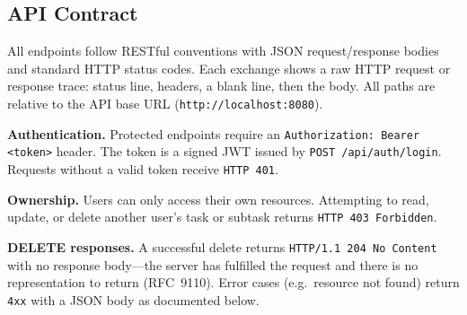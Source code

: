 \subsection{API Contract}\label{sec:api}
All endpoints follow RESTful conventions with JSON request/response bodies and standard HTTP status codes.
Each exchange shows a raw HTTP request or response trace: status line, headers, a blank line, then the body.
All paths are relative to the API base URL (\texttt{http://localhost:8080}).


\noindent\textbf{Authentication.} Protected endpoints require an \texttt{Authorization: Bearer <token>}
header. The token is a signed JWT issued by \texttt{POST /api/auth/login}. Requests without a valid
token receive \texttt{HTTP 401}.


\noindent\textbf{Ownership.} Users can only access their own resources. Attempting to read, update,
or delete another user's task or subtask returns \texttt{HTTP 403 Forbidden}.


\noindent\textbf{DELETE responses.} A successful delete returns \texttt{HTTP/1.1 204 No Content} with no
response body---the server has fulfilled the request and there is no representation to return (RFC~9110).
Error cases (e.g.\ resource not found) return \texttt{4xx} with a JSON body as documented below.

